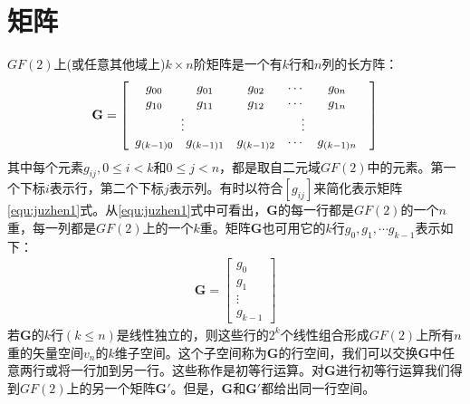 \section{矩阵\cite{Coding_Fundation}}
$GF(2)$上(或任意其他域上)$k\times n$阶矩阵是一个有$k$行和$n$列的长方阵：
\begin{eqnarray}
  \mathbf{G}=
  \left[
  \begin{array}{*{5}{c@{\quad}}}
    g_{00} & g_{01} & g_{02}& \cdots & g_{0n}\\
    g_{10} & g_{11} & g_{12}& \cdots & g_{1n}\\
    \multicolumn{2}{c}{\vdots}&\multicolumn{3}{c}{\vdots}\\
    g_{(k-1)0} & g_{(k-1)1} & g_{(k-1)2}& \cdots & g_{(k-1)n}
  \end{array}
  \right]
  \label{equ:juzhen1}
\end{eqnarray}
其中每个元素$g_{ij},0\le i <k\mbox{和}0\le
j<n$，都是取自二元域$GF(2)$中的元素。第一个下标$i$表示行，第二个下标$j$表示列。有时以符合$[g_{ij}]$来简化表示矩阵\ref{equ:juzhen1}式。从\ref{equ:juzhen1}式中可看出，$\mathbf{G}$的每一行都是$GF(2)$的一个$n$重，每一列都是$GF(2)$上的一个$k$重。矩阵$\mathbf{G}$也可用它的$k$行$g_0,g_1,\cdots
g_{k-1}$表示如下：
\begin{eqnarray}
  \mathbf{G}=
  \left[
  \begin{array}{c}
    g_0\\
    g_1\\
    \vdots\\
    g_{k-1}
  \end{array}
  \right]
  \label{equ:juzheng2}
\end{eqnarray}
若$\mathbf{G}$的$k$行$(k\le
n)$是线性独立的，则这些行的$2^k$个线性组合形成$GF(2)$上所有$n$重的矢量空间$v_n$的$k$维子空间。这个子空间称为$\mathbf{G}$的行空间，我们可以交换$\mathbf{G}$中任意两行或将一行加到另一行。这些称作是初等行运算。对$\mathbf{G}$进行初等行运算我们得到$GF(2)$上的另一个矩阵$\mathbf{G'}$。但是，$\mathbf{G}\mbox{和}\mathbf{G'}$都给出同一行空间。

